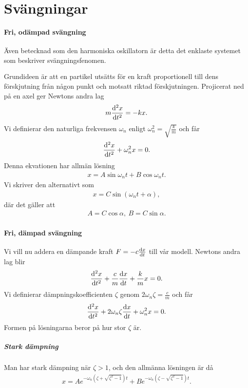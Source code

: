 \section{Svängningar}

\paragraph{Fri, odämpad svängning}
Även betecknad som den harmoniska oskillatorn är detta det enklaste systemet som beskriver svängningsfenomen.

Grundideen är att en partikel utsätts för en kraft proportionell till dens förskjutning från någon punkt och motsatt riktad förskjutningen. Projicerat ned på en axel ger Newtons andra lag
\begin{align*}
	m\dv[2]{x}{t} = -kx.
\end{align*}
Vi definierar den naturliga frekvensen $\omega_n$ enligt $\omega_n^2 = \sqrt{\frac{k}{m}}$ och får
\begin{align*}
	\dv[2]{x}{t} + \omega_n^2x = 0.
\end{align*}
Denna ekvationen har allmän lösning
\begin{align*}
	x = A\sin{\omega_nt} + B\cos{\omega_nt}.
\end{align*}
Vi skriver den alternativt som
\begin{align*}
	x = C\sin{(\omega_nt + \alpha)},
\end{align*}
där det gäller att
\begin{align*}
	A = C\cos{\alpha},\ B = C\sin{\alpha}.
\end{align*}

\paragraph{Fri, dämpad svängning}
Vi vill nu addera en dämpande kraft $F = -c\dv{x}{t}$ till vår modell. Newtons andra lag blir
\begin{align*}
	\dv[2]{x}{t} + \frac{c}{m}\dv{x}{t} + \frac{k}{m}x = 0.
\end{align*}
Vi definierar dämpningskoefficienten $\zeta$ genom $2\omega_n\zeta = \frac{c}{m}$ och får
\begin{align*}
	\dv[2]{x}{t} + 2\omega_n\zeta\dv{x}{t} + \omega_n^2x = 0.
\end{align*}
Formen på lösningarna beror på hur stor $\zeta$ är.

\subparagraph{Stark dämpning}
Man har stark dämpning när $\zeta > 1$, och den allmänna lösningen är då
\begin{align*}
	x = Ae^{-\omega_n\left(\zeta + \sqrt{\zeta^2 - 1}\right)t} + Be^{-\omega_n\left(\zeta - \sqrt{\zeta^2 - 1}\right)t}.
\end{align*}

